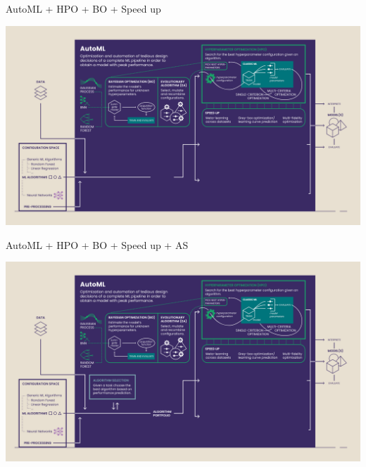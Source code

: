 	\begin{frame}[c]{AutoML +  HPO + BO + Speed up}
		
		\centering
		\includegraphics[width=.9\textwidth]{images/18_AutoML-Components-Overview-Infographic_corrected_e4}
		
	\end{frame}
	\begin{frame}[c]{AutoML + HPO + BO + Speed up + AS}
		
		\centering
		\includegraphics[width=.9\textwidth]{images/18_AutoML-Components-Overview-Infographic_corrected_e5}
		
	\end{frame}
